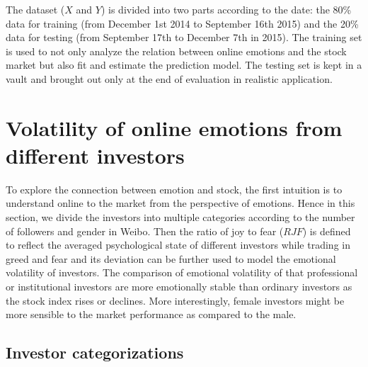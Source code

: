 \documentclass[aps,preprint,groupedaddress]{revtex4-1}
\begin{document}
The dataset ($X$ and $Y$) is divided into two parts according to the date: the 80\% data for training (from December 1st 2014 to September 16th 2015) and the 20\% data for testing (from September 17th to December 7th in 2015). The training set is used to not only analyze the relation between online emotions and the stock market but also fit and estimate the prediction model. The testing set is kept in a vault and brought out only at the end of evaluation in realistic application.

\section{Volatility of online emotions from different investors}
\label{sec:volatility}

To explore the connection between emotion and stock, the first intuition is to understand {\color{black}{how investors respond}} online to the market from the perspective of emotions. Hence in this section, we divide the investors into multiple categories according to the number of followers and gender in Weibo. {\color{black}{Note that the followers and gender information of the users can be extracted from the pubic profiles returned by Weibo's open  APIs.}} Then the ratio of joy to fear ($RJF$) is defined to reflect the averaged psychological state of different investors while trading in greed and fear and its deviation can be further used to model the emotional volatility of investors. The comparison of emotional volatility of {\color{black}{different investors demonstrate}} that professional or institutional investors are more emotionally stable than ordinary investors as the stock index rises or declines. More interestingly, female investors might be more sensible to the market performance as compared to the male.

\subsection{Investor categorizations}
\end{document}
